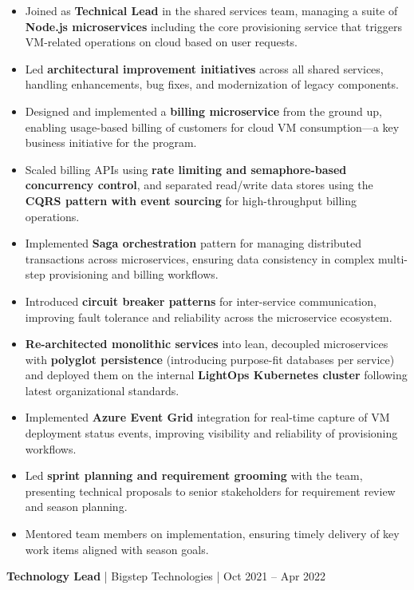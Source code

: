 \documentclass[a4paper,11pt]{article}
\newcommand{\jobtitle}[4]{
  \vspace{6pt}
  {\textbf{\textcolor{accent}{#1}} | #2 | #3}
  \vspace{2pt}
}
\begin{document}
\begin{itemize}[leftmargin=*, nosep]
  \item Joined as \textbf{Technical Lead} in the shared services team, managing a suite of \textbf{Node.js microservices} including the core provisioning service that triggers VM-related operations on cloud based on user requests.
  \item Led \textbf{architectural improvement initiatives} across all shared services, handling enhancements, bug fixes, and modernization of legacy components.
  \item Designed and implemented a \textbf{billing microservice} from the ground up, enabling usage-based billing of customers for cloud VM consumption---a key business initiative for the program.
  \item Scaled billing APIs using \textbf{rate limiting and semaphore-based concurrency control}, and separated read/write data stores using the \textbf{CQRS pattern with event sourcing} for high-throughput billing operations.
  \item Implemented \textbf{Saga orchestration} pattern for managing distributed transactions across microservices, ensuring data consistency in complex multi-step provisioning and billing workflows.
  \item Introduced \textbf{circuit breaker patterns} for inter-service communication, improving fault tolerance and reliability across the microservice ecosystem.
  \item \textbf{Re-architected monolithic services} into lean, decoupled microservices with \textbf{polyglot persistence} (introducing purpose-fit databases per service) and deployed them on the internal \textbf{LightOps Kubernetes cluster} following latest organizational standards.
  \item Implemented \textbf{Azure Event Grid} integration for real-time capture of VM deployment status events, improving visibility and reliability of provisioning workflows.
  \item Led \textbf{sprint planning and requirement grooming} with the team, presenting technical proposals to senior stakeholders for requirement review and season planning.
  \item Mentored team members on implementation, ensuring timely delivery of key work items aligned with season goals.
\end{itemize}

\vspace{8pt}
\jobtitle{Technology Lead}{Bigstep Technologies}{Oct 2021 -- Apr 2022}{}
\end{document}
